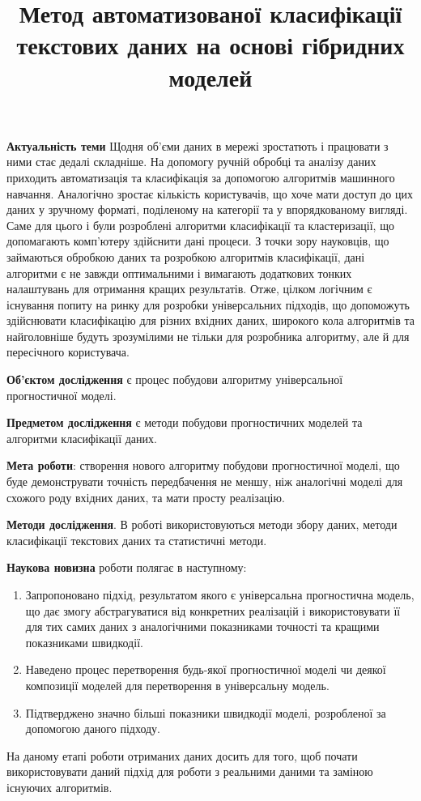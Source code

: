 \documentclass[14pt]{article}
\begin{document}
\title{Метод автоматизованої класифікації текстових даних на основі гібридних моделей}

\textbf{Актуальність теми} Щодня об'єми даних в мережі зростатють і працювати з ними стає дедалі складніше. На допомогу ручній обробці та аналізу даних приходить автоматизація та класифікація за допомогою алгоритмів машинного навчання. Аналогічно зростає кількість користувачів, що хоче мати доступ до цих даних у зручному форматі, поділеному на категорії та у впорядкованому вигляді. Саме для цього і були розроблені алгоритми класифікації та кластеризації, що допомагають комп'ютеру здійснити дані процеси. З точки зору науковців, що займаються обробкою даних та розробкою алгоритмів класифікації, дані алгоритми є не завжди оптимальними і вимагають додаткових тонких налаштувань для отримання кращих результатів. Отже, цілком логічним є існування попиту на ринку для розробки універсальних підходів, що допоможуть здійснювати класифікацію для різних вхідних даних, широкого кола алгоритмів та найголовніше будуть зрозумілими не тільки для розробника алгоритму, але й для пересічного користувача.

\textbf{Об'єктом дослідження} є процес побудови алгоритму універсальної прогностичної моделі.

\textbf{Предметом дослідження} є методи побудови прогностичних моделей та алгоритми класифікації даних.

\textbf{Мета роботи}: створення нового алгоритму побудови прогностичної моделі, що буде демонструвати точність передбачення не меншу, ніж аналогічні моделі для схожого роду вхідних даних, та мати просту реалізацію.

\textbf{Методи дослідження}. В роботі використовуються методи збору даних, методи класифікації текстових даних та статистичні методи.

\textbf{Наукова новизна} роботи полягає в наступному:

\begin{enumerate}
	\item Запропоновано підхід, результатом якого є універсальна прогностична модель, що дає змогу абстрагуватися від конкретних реалізацій і використовувати її для тих самих даних з аналогічними показниками точності та кращими показниками швидкодії.
	\item Наведено процес перетворення будь-якої прогностичної моделі чи деякої композиції моделей для перетворення в універсальну модель.
	\item Підтверджено значно більші показники швидкодії моделі, розробленої за допомогою даного підходу.
\end{enumerate}
На даному етапі роботи отриманих даних досить для того, щоб почати використовувати даний підхід для роботи з реальними даними та заміною існуючих алгоритмів.
\end{document}
